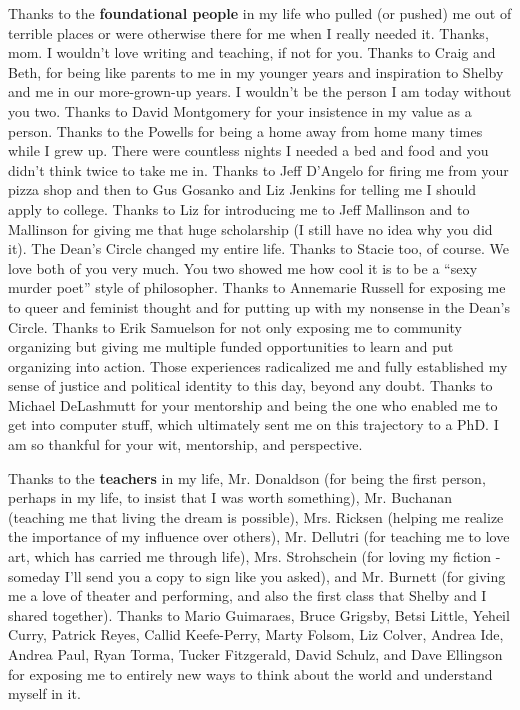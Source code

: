 \documentclass[12pt]{cmuthesis}
\begin{document}
Thanks to the \textbf{foundational people} in my life who pulled (or pushed) me out of terrible places or were otherwise there for me when I really needed it. Thanks, mom. I wouldn't love writing and teaching, if not for you. Thanks to Craig and Beth, for being like parents to me in my younger years and inspiration to Shelby and me in our more-grown-up years. I wouldn't be the person I am today without you two. Thanks to David Montgomery for your insistence in my value as a person. Thanks to the Powells for being a home away from home many times while I grew up. There were countless nights I needed a bed and food and you didn't think twice to take me in. Thanks to Jeff D'Angelo for firing me from your pizza shop and then to Gus Gosanko and Liz Jenkins for telling me I should apply to college. Thanks to Liz for introducing me to Jeff Mallinson and to Mallinson for giving me that huge scholarship (I still have no idea why you did it). The Dean's Circle changed my entire life. Thanks to Stacie too, of course. We love both of you very much. You two showed me how cool it is to be a ``sexy murder poet'' style of philosopher. Thanks to Annemarie Russell for exposing me to queer and feminist thought and for putting up with my nonsense in the Dean's Circle. Thanks to Erik Samuelson for not only exposing me to community organizing but giving me multiple funded opportunities to learn and put organizing into action. Those experiences radicalized me and fully established my sense of justice and political identity to this day, beyond any doubt. Thanks to Michael DeLashmutt for your mentorship and being the one who enabled me to get into computer stuff, which ultimately sent me on this trajectory to a PhD. I am so thankful for your wit, mentorship, and perspective.

Thanks to the \textbf{teachers} in my life, Mr. Donaldson (for being the first person, perhaps in my life, to insist that I was worth something), Mr. Buchanan (teaching me that living the dream is possible), Mrs. Ricksen (helping me realize the importance of my influence over others), Mr. Dellutri (for teaching me to love art, which has carried me through life), Mrs. Strohschein (for loving my fiction - someday I'll send you a copy to sign like you asked), and Mr. Burnett (for giving me a love of theater and performing, and also the first class that Shelby and I shared together). Thanks to Mario Guimaraes, Bruce Grigsby, Betsi Little, Yeheil Curry, Patrick Reyes, Callid Keefe-Perry, Marty Folsom, Liz Colver, Andrea Ide, Andrea Paul, Ryan Torma, Tucker Fitzgerald, David Schulz, and Dave Ellingson for exposing me to entirely new ways to think about the world and understand myself in it.
\end{document}
